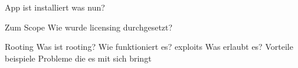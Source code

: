 App ist installiert was nun?

Zum Scope
Wie wurde licensing durchgesetzt?

Rooting
Was ist rooting?
Wie funktioniert es? exploits
Was erlaubt es?
Vorteile
beispiele
Probleme die es mit sich bringt




%

%
%


%

%
%

